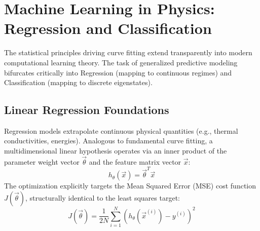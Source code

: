 \documentclass[aps, reprint, twocolumn, superscriptaddress, floatfix]{revtex4-2}
\begin{document}
\section{Machine Learning in Physics: Regression and Classification}

The statistical principles driving curve fitting extend transparently into modern computational learning theory. The task of generalized predictive modeling bifurcates critically into Regression (mapping to continuous regimes) and Classification (mapping to discrete eigenstates).

\subsection{Linear Regression Foundations}
Regression models extrapolate continuous physical quantities (e.g., thermal conductivities, energies). Analogous to fundamental curve fitting, a multidimensional linear hypothesis operates via an inner product of the parameter weight vector $\vec{\theta}$ and the feature matrix vector $\vec{x}$:
\begin{equation}
    h_{\theta}(\vec{x}) = \vec{\theta}^T \vec{x}
\end{equation}
The optimization explicitly targets the Mean Squared Error (MSE) cost function $J(\vec{\theta})$, structurally identical to the least squares target:
\begin{equation}
    J(\vec{\theta}) = \frac{1}{2N} \sum_{i=1}^{N} \left( h_{\theta}(\vec{x}^{(i)}) - y^{(i)} \right)^2
\end{equation}
\end{document}
